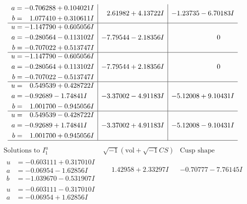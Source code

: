 \documentclass[1p]{elsarticle_modified}
\theoremstyle{definition}
\newcommand{\I}{\sqrt{-1}}
\begin{document}
$$\begin{array}{c|c|c}
\begin{aligned}
a &= -0.706288 + 0.104021 I \\
b &= \phantom{-}1.077410 + 0.310611 I\end{aligned}
 & \phantom{-}2.61982 + 4.13722 I & -1.23735 - 6.70183 I \\ \hline\begin{aligned}
u &= -1.147790 + 0.605056 I \\
a &= -0.280564 - 0.113102 I \\
b &= -0.707022 + 0.513747 I\end{aligned}
 & -7.79544 - 2.18356 I & \phantom{-0.000000 } 0 \\ \hline\begin{aligned}
u &= -1.147790 - 0.605056 I \\
a &= -0.280564 + 0.113102 I \\
b &= -0.707022 - 0.513747 I\end{aligned}
 & -7.79544 + 2.18356 I & \phantom{-0.000000 } 0 \\ \hline\begin{aligned}
u &= \phantom{-}0.549539 + 0.428722 I \\
a &= -0.92689 - 1.74841 I \\
b &= \phantom{-}1.001700 - 0.945056 I\end{aligned}
 & -3.37002 - 4.91183 I & -5.12008 + 9.10431 I \\ \hline\begin{aligned}
u &= \phantom{-}0.549539 - 0.428722 I \\
a &= -0.92689 + 1.74841 I \\
b &= \phantom{-}1.001700 + 0.945056 I\end{aligned}
 & -3.37002 + 4.91183 I & -5.12008 - 9.10431 I\\
 \hline 
 \end{array}$$\newpage$$\begin{array}{c|c|c}  
\text{Solutions to }I^u_{1}& \I (\text{vol} + \sqrt{-1}CS) & \text{Cusp shape}\\
 \hline 
\begin{aligned}
u &= -0.603111 + 0.317010 I \\
a &= -0.06954 - 1.62856 I \\
b &= -1.039670 - 0.531907 I\end{aligned}
 & \phantom{-}1.42958 + 2.33297 I & -0.70777 - 7.76145 I \\ \hline\begin{aligned}
u &= -0.603111 - 0.317010 I \\
a &= -0.06954 + 1.62856 I \\

\end{aligned}
\end{array}$$
\end{document}
